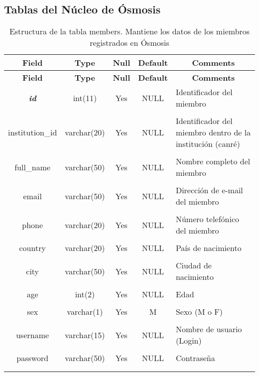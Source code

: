 \subsection{Tablas del Núcleo de Ósmosis}
%
%
\begin{longtable}{c c c c l}
	\multicolumn{1}{c}{\textbf{Field}} &
	\multicolumn{1}{c}{\textbf{Type}} &
	\multicolumn{1}{c}{\textbf{Null}} &
	\multicolumn{1}{c}{\textbf{Default}} &
	\multicolumn{1}{c}{\textbf{Comments}} \\ \hline \hline
\endfirsthead
	\multicolumn{1}{c}{\textbf{Field}} &
	\multicolumn{1}{c}{\textbf{Type}} &
	\multicolumn{1}{c}{\textbf{Null}} &
	\multicolumn{1}{c}{\textbf{Default}} &
	\multicolumn{1}{c}{\textbf{Comments}} \\ \hline \hline
\endhead \endfoot
	\textbf{\textit{id}} & int(11)  & Yes & NULL & \parbox[t]{0.35\textwidth}{Identificador del miembro} \\ \\ \hline
	institution\_id & varchar(20) & Yes & NULL & \parbox[t]{0.35\textwidth}{Identificador del miembro dentro de la institución (canré)} \\ \\ \hline
	full\_name & varchar(50) & Yes & NULL & \parbox[t]{0.35\textwidth}{Nombre completo del miembro} \\ \\ \hline
	email & varchar(50) & Yes & NULL & \parbox[t]{0.35\textwidth}{Dirección de e-mail del miembro} \\ \\ \hline
	phone & varchar(20) & Yes & NULL & \parbox[t]{0.35\textwidth}{Número telefónico del miembro} \\ \\ \hline
	country & varchar(20) & Yes & NULL & \parbox[t]{0.35\textwidth}{País de nacimiento} \\ \\  \hline
	city & varchar(50) & Yes & NULL & \parbox[t]{0.35\textwidth}{Ciudad de nacimiento} \\ \\ \hline 
	age & int(2) & Yes & NULL & \parbox[t]{0.35\textwidth}{Edad} \\ \\  \hline
	sex & varchar(1) & Yes & M & \parbox[t]{0.35\textwidth}{Sexo (M o F)} \\ \\  \hline
	username & varchar(15) & Yes & NULL & \parbox[t]{0.35\textwidth}{Nombre de usuario (Login)} \\ \\  \hline
	password & varchar(50) & Yes & NULL & \parbox[t]{0.35\textwidth}{Contraseña} \\ \\
\caption[Estructura de la tabla members]{Estructura de la tabla members. Mantiene los datos de los miembros registrados en Ósmosis} \label{tab:members-structure} \\  
\end{longtable}

